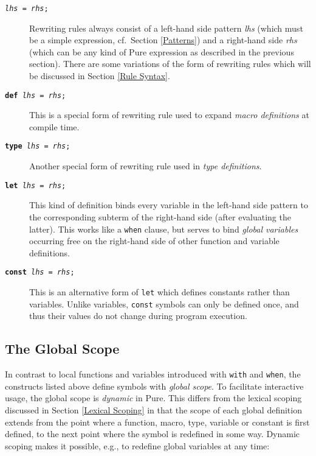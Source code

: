 \documentclass[a4paper,12pt]{article}
\newcommand{\kw}[1]{\texttt{\textbf{#1}}}
\newcommand{\nt}[1]{\textrm{\textit{#1\/}}}
\begin{document}
\begin{description}
\item[\rm\texttt{\nt{lhs} = \nt{rhs};}] Rewriting rules always consist of a left-hand side pattern \nt{lhs} (which must be a simple expression, cf.\ Section \ref{Patterns}) and a right-hand side \nt{rhs} (which can be any kind of Pure expression as described in the previous section). There are some variations of the form of rewriting rules which will be discussed in Section \ref{Rule Syntax}.
\item[\rm\texttt{\kw{def} \nt{lhs} = \nt{rhs};}] This is a special form of rewriting rule used to expand \emph{macro definitions} at compile time.
\item[\rm\texttt{\kw{type} \nt{lhs} = \nt{rhs};}] Another special form of rewriting rule used in \emph{type definitions}.
\item[\rm\texttt{\kw{let} \nt{lhs} = \nt{rhs};}] This kind of definition binds every variable in the left-hand side pattern to the corresponding subterm of the right-hand side (after evaluating the latter). This works like a \lstinline{when} clause, but serves to bind \emph{global variables} occurring free on the right-hand side of other function and variable definitions.
\item[\rm\texttt{\kw{const} \nt{lhs} = \nt{rhs};}] This is an alternative form of \lstinline{let} which defines constants rather than variables. Unlike variables, \lstinline{const} symbols can only be defined once, and thus their values do not change during program execution.
\end{description}

\subsection{The Global Scope}

In contrast to local functions and variables introduced with \lstinline{with} and \lstinline{when}, the constructs listed above define symbols with \emph{global scope}. To facilitate interactive usage, the global scope is \emph{dynamic} in Pure. This differs from the lexical scoping discussed in Section \ref{Lexical Scoping} in that the scope of each global definition extends from the point where a function, macro, type, variable or constant is first defined, to the next point where the symbol is redefined in some way. Dynamic scoping makes it possible, e.g., to redefine global variables at any time:
\end{document}
